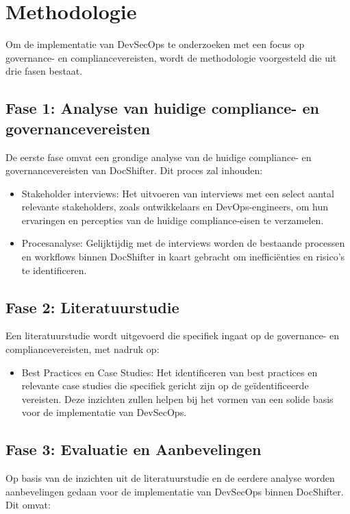 \documentclass{hogent-article}
\begin{document}
    
    \section{Methodologie}%
    \label{sec:methodologie}
    
    \noindent Om de implementatie van DevSecOps te onderzoeken met een focus op governance- en compliancevereisten, wordt de methodologie voorgesteld die uit drie fasen bestaat. 
    
    \subsection{Fase 1: Analyse van huidige compliance- en governancevereisten}
    \noindent De eerste fase omvat een grondige analyse van de huidige compliance- en governancevereisten van DocShifter. Dit proces zal inhouden:
    
    \begin{itemize}
        \item Stakeholder interviews: Het uitvoeren van interviews met een select aantal relevante stakeholders, zoals ontwikkelaars en DevOps-engineers, om hun ervaringen en percepties van de huidige compliance-eisen te verzamelen.
        \item Procesanalyse: Gelijktijdig met de interviews worden de bestaande processen en workflows binnen DocShifter in kaart gebracht om inefficiënties en risico’s te identificeren.
    \end{itemize}
    
    \subsection{Fase 2: Literatuurstudie}
    \noindent Een literatuurstudie wordt uitgevoerd die specifiek ingaat op de governance- en compliancevereisten, met nadruk op:
    
    \begin{itemize}
        \item Best Practices en Case Studies: Het identificeren van best practices en relevante case studies die specifiek gericht zijn op de geïdentificeerde vereisten. Deze inzichten zullen helpen bij het vormen van een solide basis voor de implementatie van DevSecOps.
    \end{itemize}
    
    \subsection{Fase 3: Evaluatie en Aanbevelingen}
    \noindent Op basis van de inzichten uit de literatuurstudie en de eerdere analyse worden aanbevelingen gedaan voor de implementatie van DevSecOps binnen DocShifter. Dit omvat:
    
\end{document}
